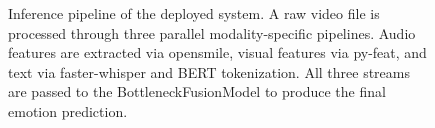 \begin{figure}[H]
{
}
\caption{Inference pipeline of the deployed system. A raw video file is processed through three parallel modality-specific pipelines. Audio features are extracted via opensmile, visual features via py-feat, and text via faster-whisper and BERT tokenization. All three streams are passed to the BottleneckFusionModel to produce the final emotion prediction.}
\label{fig:inference_pipeline}
\end{figure}